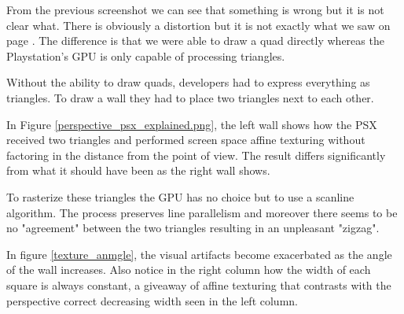 From the previous screenshot we can see that something is wrong but it is not clear what. There is obviously a distortion but it is not exactly what we saw on page \pageref{affine_texture_examples}. The difference is that we were able to draw a quad directly whereas the Playstation's GPU is only capable of processing triangles.\\
\par
 Without the ability to  draw quads, developers had to express everything as triangles. To draw a wall they had to place two triangles next to each other.\\
\par
{}
\par
In Figure \ref{perspective_psx_explained.png}, the left wall shows how the PSX received two triangles and performed screen space affine texturing without factoring in the distance from the point of view. The result differs significantly from what it should have been as the right wall shows.\\
\par
 To rasterize these triangles the GPU has no choice but to use a scanline algorithm. The process preserves line parallelism and moreover there seems to be no "agreement" between the two triangles resulting in an unpleasant "zigzag".\\
\par
In figure \ref{texture_anmgle}, the visual artifacts become exacerbated as the angle of the wall increases. Also notice in the right column how the width of each square is always constant, a giveaway of affine texturing that contrasts with the perspective correct decreasing width seen in the left column.\\ 
\pagebreak





